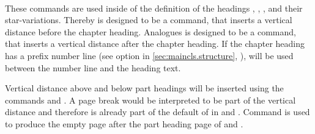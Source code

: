 \begin{Declaration}
  \\
  \\
  \\
  \\
  \\
  \\
\end{Declaration}
%
%
%
%
%
%
%
These commands are used inside of the definition of the headings
, , ,
 and their star-variations. Thereby
 is designed to be a command, that inserts a
vertical distance before the chapter heading. Analogues
 is designed to be a command, that inserts a vertical
distance after the chapter heading. If the chapter heading has a prefix number line (see option
 in \autoref{sec:maincls.structure},
), 
will be used between the number line and the heading text.

Vertical distance above and below part headings will be inserted using the
commands  and . A page break
would be interpreted to be part of the vertical distance and therefore is
already part of the default of  in
 and
. Command
 is used to produce the empty page after the part heading
page of  and .


